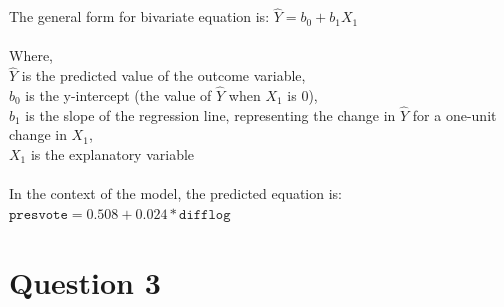 \documentclass[12pt,letterpaper]{article}
\begin{document}
\begin{enumerate}
		\noindent The general form for bivariate equation is:
		$\hat{Y} = b_0 + b_1 X_1$\\
		\\Where,\\
		$\hat{Y}$ is the predicted value of the outcome variable,\\
		$b_0$ is the y-intercept (the value of $\hat{Y}$ when $X_1$ is 0),\\
		$b_1$ is the slope of the regression line, representing the change in $\hat{Y}$ for a one-unit change in $X_1$,\\
		$X_1$ is the explanatory variable\\
		\\
		In the context of the model, the predicted equation is:\\
		\textit{$\texttt{presvote} = 0.508 + 0.024*\texttt{difflog}$}
		
	\end{enumerate}
	
	\newpage	
\section*{Question 3}
\end{document}
